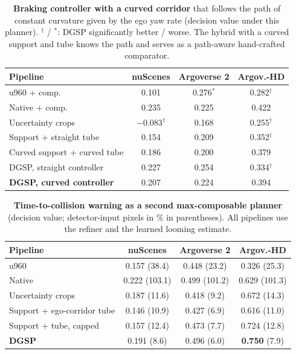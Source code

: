 \documentclass[10pt,letterpaper]{article}
\newcommand{\method}{DGSP\xspace}
\newcommand{\best}[1]{\textbf{#1}}
\newcommand{\oursrow}{\rowcolor{oursbg}}
\theoremstyle{remark}
\theoremstyle{plain}
\theoremstyle{definition}
\begin{document}
\begin{table}[!htbp]
\centering
\caption{\textbf{Braking controller with a curved corridor} that follows the path of constant curvature given by the ego yaw rate (decision value under this planner). $^{\dagger}$ / $^{\ast}$: \method significantly better / worse. The hybrid with a curved support and tube knows the path and serves as a path-aware hand-crafted comparator.}
\label{tab:curved}
\small
\setlength{\tabcolsep}{3pt}
\begin{tabular}{@{}lccc@{}}
\toprule
Pipeline & nuScenes & Argoverse 2 & Argov.-HD \\
\midrule
u960 + comp. & 0.101 & 0.276$^{\ast}$ & 0.282$^{\dagger}$ \\
Native + comp. & 0.235 & 0.225 & 0.422 \\
Uncertainty crops & $-$0.083$^{\dagger}$ & 0.168 & 0.255$^{\dagger}$ \\
Support + straight tube & 0.154 & 0.209 & 0.352$^{\dagger}$ \\
Curved support + curved tube & 0.186 & 0.200 & 0.379 \\
\method, straight controller & 0.227 & 0.254 & 0.334$^{\dagger}$ \\
\midrule
\oursrow \textbf{\method, curved controller} & 0.207 & 0.224 & 0.394 \\
\bottomrule
\end{tabular}
\end{table}

\begin{table}[!tbp]
\centering
\caption{\textbf{Time-to-collision warning as a second max-composable planner} (decision value; detector-input pixels in \% in parentheses). All pipelines use the refiner and the learned looming estimate.}
\label{tab:consumer2}
\small
\setlength{\tabcolsep}{2.4pt}
\begin{tabular}{@{}lccc@{}}
\toprule
Pipeline & nuScenes & Argoverse 2 & Argov.-HD \\
\midrule
u960 & 0.157 (38.4) & 0.448 (23.2) & 0.326 (25.3) \\
Native & 0.222 (103.1) & 0.499 (101.2) & 0.629 (101.3) \\
Uncertainty crops & 0.187 (11.6) & 0.418 (9.2) & 0.672 (14.3) \\
Support + ego-corridor tube & 0.146 (10.9) & 0.427 (6.9) & 0.616 (11.0) \\
Support + tube, capped & 0.157 (12.4) & 0.473 (7.7) & 0.724 (12.8) \\
\oursrow \textbf{\method} & 0.191 (8.6) & 0.496 (6.0) & \best{0.750} (7.9) \\
\bottomrule
\end{tabular}
\end{table}
\end{document}
